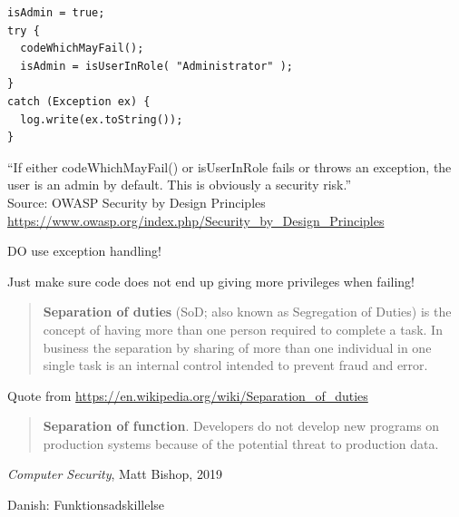 \documentclass[Screen16to9,17pt]{foils}
\begin{document}

\begin{verbatim}
isAdmin = true;
try {
  codeWhichMayFail();
  isAdmin = isUserInRole( "Administrator" );
}
catch (Exception ex) {
  log.write(ex.toString());
}
\end{verbatim}
``If either codeWhichMayFail() or isUserInRole fails or throws an exception, the user is an admin by default. This is obviously a security risk.''\\
Source: OWASP Security by Design Principles\\
\url{https://www.owasp.org/index.php/Security_by_Design_Principles}

\begin{list2}
\item DO use exception handling!
\item Just make sure code does not end up giving more privileges when failing!
\end{list2}




\begin{quote}
{\bf Separation of duties} (SoD; also known as Segregation of Duties) is the concept of having more than one person required to complete a task. In business the separation by sharing of more than one individual in one single task is an internal control intended to prevent fraud and error.
\end{quote}

Quote from \url{https://en.wikipedia.org/wiki/Separation_of_duties}

\begin{quote}
{\bf Separation of function}. Developers do not develop new programs on production systems because of the potential threat to production data.
\end{quote}
\emph{Computer Security}, Matt Bishop, 2019

Danish: Funktionsadskillelse


\end{document}
